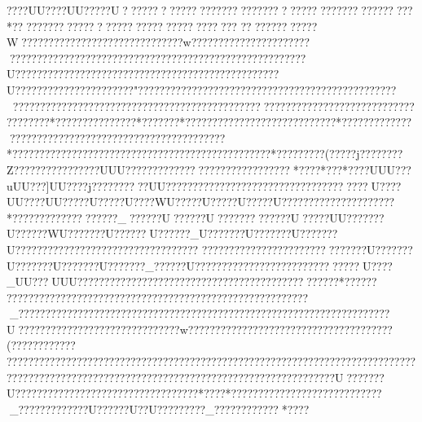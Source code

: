 {{{{{{{{{{{{{{{{{{{{{{{{{{{{{{{{{{{{{{{{{{{{{{{{{{{{{{{{{{{{{{{{{{{{{{{{{{{{{{{{{{{{{{{{{{{{{{{{{{{{{{{{{{{{{{{{{{{{{{{{{{{{{{{{{{{{{{{{{{{{{{{{{{{{{{{{{{{{{{{{{{{{{{{{{{{{{{{{{{{{{{{{{{{{{{{{{{{{{{{{{{{{{{{{{{{{{{{{{{{{{{{{{{{{{{{{{{{{{{{{{{{{{{{{{{{{{{{{{{{{{{{{{{{{{{{{{{{{{{{{{{{{{{{{{{{{{{{{{{{{{{{{{{{{{{{{{{{{{{{{{{{{{{{{{{{{{{{{{{{{{{{{{{{{{{{{{{{{{{{{{{{{{{{{{{{{{{{{{{{{{{{{{{{{{{{{{{{{{{{{{{{{{{{{{{{{{{{{{{{{{{{{{{{{{{{{{{{{{{{{{{{{{{{{{{{{{{{{{{{{{{{{{{{{{{{{{{{{{{{{{{{{{{{{{{{{{{{{{{{{{{{{{{{{{{{{{{{{{{{{{{{{{{{{{{{{{{{{{{{{{{{{{{{{{{{{{{{{{{{{{{{{{{{{{{{{{{{{{{{{{{{{{{{{{{{{{{{{{{{{{{{{{{{{{{{{{{{{{{{{{{{{{{{{{{{{{{{{{{{{{{{{{{{{{{{{{{{{{{{{{{{{{{{{{{{{{{{{{{{{{{{{{{{{{{{{{{{{{{{{{{{{{{{{{{{{{{{{{{{{{{{{{{{{{{{{{{{{{{{{{{{{{{{{{{{{{{{{{{{{{{{{{{{{{{{{{{{{{{{{{{{{{{{{{{{{????UU????UU?????U??????????????????????????????????????????? ????? *????????????  ???????????  ?????  ????  ?????  ????? ?????? ??W??????????????????????????????w??????? ??????????????????????????????????????????????????????????????????????U?????????????????????????????????????????????????U??????????????????????"??????????????????????????????????????????????????????????????????????????????????????????????????????????????????????????????????*???????????????*??????? *????????????????????????????*?????????????????????????????????????????????????????*????????????????????????????????????????????????*?????????(?????j??   ??????Z????????????????UUU??????????????????????????????*????  *???   *????UUU???uUU???]UU??    ??j??????????UU?????????????????????????????????????U????UU????UU?????U?????U????WU?????U?????U?????U?????????????????????*????? ????? ?????????_??????U??????U?????????????U?????UU???????U??????WU???????U??????U??????_U???????U???????U???????U????????????????????????????  ?????? 
?????? ??????? ?????????????????U???????U???????U???????U???????_??????U????  ??????  ?????? ??????????????U????_UU???UUU??  ???? ????? ?????????????????????????????????????*??????   
????????????????????????????????????????????????????????_?????????????????????????????????????????????????????????????????????U??????????????????????????????w?????????????????????????????????????? (????????????
?????????????????????????????????????????????????????????????????????????????????????????????????????? ???????????????????????????????????U???????U??????????????????????? ??????????? *???? *???? ?????  ???????????????????_?????  ????????U??????U??U?????????_????????????*????
}}}}}}}}}}}}}}}}}}}}}}}}}}}}}}}}}}}}}}}}}}}}}}}}}}}}}}}}}}}}}}}}}}}}}}}}}}}}}}}}}}}}}}}}}}}}}}}}}}}}}}}}}}}}}}}}}}}}}}}}}}}}}}}}}}}}}}}}}}}}}}}}}}}}}}}}}}}}}}}}}}}}}}}}}}}}}}}}}}}}}}}}}}}}}}}}}}}}}}}}}}}}}}}}}}}}}}}}}}}}}}}}}}}}}}}}}}}}}}}}}}}}}}}}}}}}}}}}}}}}}}}}}}}}}}}}}}}}}}}}}}}}}}}}}}}}}}}}}}}}}}}}}}}}}}}}}}}}}}}}}}}}}}}}}}}}}}}}}}}}}}}}}}}}}}}}}}}}}}}}}}}}}}}}}}}}}}}}}}}}}}}}}}}}}}}}}}}}}}}}}}}}}}}}}}}}}}}}}}}}}}}}}}}}}}}}}}}}}}}}}}}}}}}}}}}}}}}}}}}}}}}}}}}}}}}}}}}}}}}}}}}}}}}}}}}}}}}}}}}}}}}}}}}}}}}}}}}}}}}}}}}}}}}}}}}}}}}}}}}}}}}}}}}}}}}}}}}}}}}}}}}}}}}}}}}}}}}}}}}}}}}}}}}}}}}}}}}}}}}}}}}}}}}}}}}}}}}}}}}}}}}}}}}}}}}}}}}}}}}}}}}}}}}}}}}}}}}}}}}}}}}}}}}}}}}}}}}}}}}}}}}}}}}}}}}}}}}}}}}}}}}}}}}}}}}}}}}}}}}}}}}}}}}}}}}}}}}}}}}}}}}}}}}}}}}}}}}}}}}}}}}}}}}}}}}}}}}}}}}}}}}}}}}}}}}}
